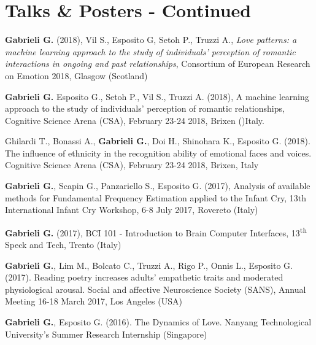 \documentclass[a4paper]{deedy-resume} %
\begin{document}
\begin{minipage}[t]{0.63\textwidth}
\begin{tightitemize}
	\end{tightitemize}
		
\end{minipage} %
	
\newpage %
\begin{minipage}[t]{0.28\textwidth} %

\end{minipage} %
\begin{minipage}[t]{0.03\textwidth} %
\end{minipage} %
\hfill
\begin{minipage}[t]{0.63\textwidth} %
	
	\section{Talks \& Posters - Continued}
	
	\sectionspace %
	\begin{tightitemize}
		\item \textbf{Gabrieli G.} (2018), Vil S., Esposito G, Setoh P., Truzzi A., \textit{Love patterns: a machine learning approach to the study of individuals’ perception of romantic interactions in ongoing and past relationships}, Consortium of European Research on Emotion 2018, Glasgow (Scotland)	
	    \item \textbf{Gabrieli G.} Esposito G., Setoh P., Vil S., Truzzi A. (2018),	A machine learning approach to the study of individuals’ perception of romantic relationships, Cognitive Science Arena (CSA), February 23-24 2018, Brixen ()Italy.
		\item Ghilardi T., Bonassi A., \textbf{Gabrieli G.}, Doi H., Shinohara K., Esposito G. (2018). The influence of ethnicity in the recognition ability of emotional faces and voices. Cognitive Science Arena (CSA), February 23-24 2018, Brixen, Italy
		\item \textbf{Gabrieli G.}, Scapin G., Panzariello S., Esposito G. (2017), Analysis of available methods for Fundamental Frequency Estimation applied to the Infant Cry, 13th International Infant Cry Workshop, 6-8 July 2017, Rovereto (Italy)
		\item \textbf{Gabrieli G.} (2017), BCI 101 - Introduction to Brain Computer Interfaces, 13\textsuperscript{th} Speck and Tech, Trento (Italy)	
		\item \textbf{Gabrieli G.}, Lim M., Bolcato C., Truzzi A., Rigo P., Onnis L., Esposito G. (2017). Reading poetry increases adults' empathetic traits and moderated physiological arousal. Social and affective Neuroscience Society (SANS), Annual Meeting 16-18 March 2017, Los Angeles (USA)
		\item  \textbf{Gabrieli G.}, Esposito G. (2016). The Dynamics of Love. Nanyang Technological University's Summer Research Internship (Singapore)
	\end{tightitemize}
	

\end{minipage}
\end{document}
